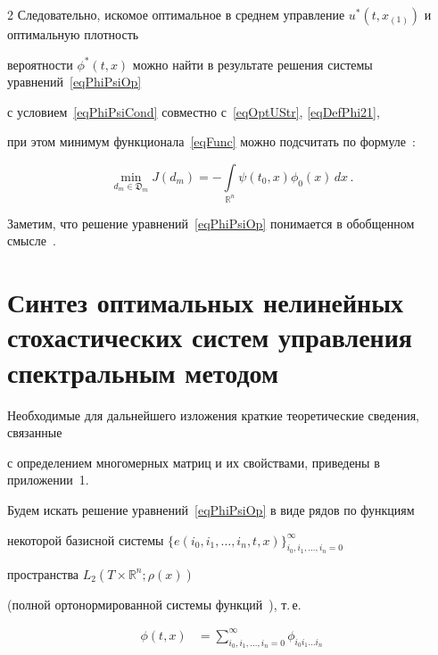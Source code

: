 \begin{multicols}{2}
Следовательно, искомое оптимальное в среднем управление $u^*(t,x_{(1)})$ и оптимальную плотность 


вероятности $\phi^*(t,x)$ можно найти в результате решения сис\-те\-мы уравнений~\eqref{eqPhiPsiOp} 


с условием~\eqref{eqPhiPsiCond} совместно с~\eqref{eqOptUStr}, \eqref{eqDefPhi21}, 


при этом минимум функционала~\eqref{eqFunc} можно подсчитать по формуле~\cite{Pan_Synt}:


\begin{equation}


\label{eqFuncMin}


\min\limits_{d_m \in \mathfrak{D}_m} J(d_m) = 


- \int\limits_{\mathbb{R}^n} \psi(t_0,x) \phi_0(x) \,dx\,.


\end{equation}





Заметим, что решение уравнений~\eqref{eqPhiPsiOp} понимается в обобщенном смысле~\cite{Sob}.





\section{Синтез оптимальных нелинейных стохастических систем управления спектральным методом}





Необходимые для дальнейшего изложения краткие теоретические сведения, связанные 


с определением многомерных матриц и их свойствами, приведены в приложении~1.





Будем искать решение уравнений~\eqref{eqPhiPsiOp} в виде рядов по функциям 


некоторой базисной сис\-те\-мы ${\{e(i_0,i_1,\dots,i_n,t,x)\}_{i_0,i_1,\dots,i_n = 0}^\infty}$ 


пространства ${L_2(T \times \mathbb{R}^n; \rho(x))}$ 


(полной ортонормированной сис\-те\-мы функций~\cite{Pug}), т.\,е.\


\begin{align}


\phi(t,x) &= \!\!\!\sum\limits_{i_0,i_1,\dots,i_n = 0}^\infty \!\!\!\phi_{i_0 i_1 \dots i_n} 



\end{align}
\end{multicols}
